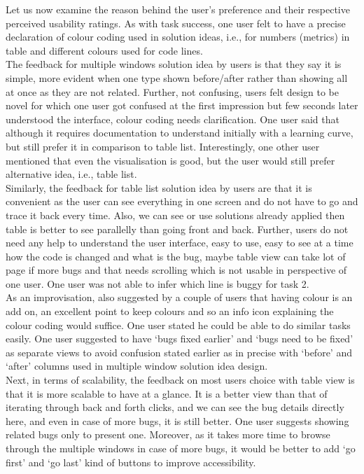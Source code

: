 Let us now examine the reason behind the user’s preference and their respective perceived usability ratings. As with task success, one user felt to have a precise declaration of colour coding used in solution ideas, i.e., for numbers (metrics) in table and different colours used for code lines. \\

The feedback for multiple windows solution idea by users is that they say it is simple, more evident when one type shown before/after rather than showing all at once as they are not related. Further, not confusing, users felt design to be novel for which one user got confused at the first impression but few seconds later understood the interface, colour coding needs clarification. One user said that although it requires documentation to understand initially with a learning curve, but still prefer it in comparison to table list. Interestingly, one other user mentioned that even the visualisation is good, but the user would still prefer alternative idea, i.e., table list. \\

Similarly, the feedback for table list solution idea by users are that it is convenient as the user can see everything in one screen and do not have to go and trace it back every time. Also, we can see or use solutions already applied then table is better to see parallelly than going front and back. Further, users do not need any help to understand the user interface, easy to use, easy to see at a time how the code is changed and what is the bug, maybe table view can take lot of page if more bugs and that needs scrolling which is not usable in perspective of one user. One user was not able to infer which line is buggy for task 2. \\

As an improvisation, also suggested by a couple of users that having colour is an add on, an excellent point to keep colours and so an info icon explaining the colour coding would suffice. One user stated he could be able to do similar tasks easily. One user suggested to have ‘bugs fixed earlier’ and ‘bugs need to be fixed’ as separate views to avoid confusion stated earlier as in precise with ‘before’ and ‘after’ columns used in multiple window solution idea design. \\

Next, in terms of scalability, the feedback on most users choice with table view is that it is more scalable to have at a glance. It is a better view than that of iterating through back and forth clicks, and we can see the bug details directly here, and even in case of more bugs, it is still better. One user suggests showing related bugs only to present one. Moreover, as it takes more time to browse through the multiple windows in case of more bugs, it would be better to add ‘go first’ and ‘go last’ kind of buttons to improve accessibility. \\

